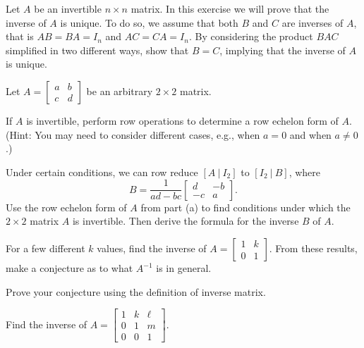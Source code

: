 \label{sec:inverse_exer}

\be


\item \label{ex:2_c_unique_inverse} Let $A$ be an invertible $n \times n$ matrix. In this exercise we will prove that the inverse of $A$ is unique. To do so, we assume that both $B$ and $C$ are inverses of $A$, that is $AB=BA = I_n$ and $AC=CA = I_n$. By considering the product $BAC$ simplified in two different ways, show that $B=C$, implying that the inverse of $A$ is unique. 

\item \label{ex:2_c_2by2_inverse} Let $A = \left[ \begin{array}{cc} a&b \\ c&d \end{array} \right]$ be an arbitrary $2 \times 2$ matrix. 
	\ba
	\item If $A$ is invertible, perform row operations to determine a row echelon form of $A$. (Hint: You may need to consider different cases, e.g., when $a=0$ and when $a \neq 0$.)

	\item Under certain conditions, we can row reduce $[A \ | \ I_2]$ to $[I_2 \ | \ B]$, where 
\[B=\frac{1}{ad-bc} \left[ \begin{array}{rr} d&-b \\ -c&a \end{array} \right].\]
Use the row echelon form of $A$ from part (a) to find conditions under which the $2 \times 2$ matrix $A$ is invertible. Then derive the formula for the inverse $B$ of $A$. 
	\ea

\item \ba 
\item For a few different $k$ values, find the inverse of $A = \left[ \begin{array}{cc} 1&k \\ 0&1 \end{array} \right]$. From these results, make a conjecture as to what $A^{-1}$ is in general.

\item Prove your conjecture using the definition of inverse matrix. 

\item Find the inverse of $A = \left[ \begin{array}{ccc} 1&k&\ell \\ 0&1&m\\0&0&1 \end{array} \right]$.
\ea

